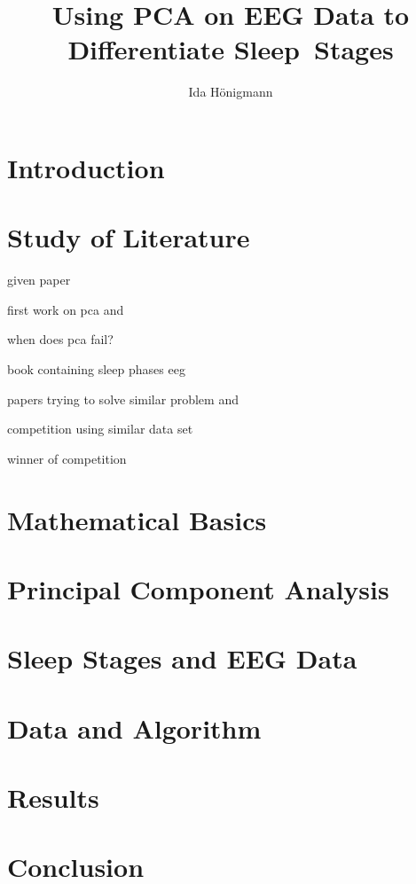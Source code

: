 \documentclass[a4paper]{IEEEtran}
\title{Using PCA on EEG Data to Differentiate Sleep~Stages}
\author{Ida Hönigmann}
\begin{document}
\maketitle

\begin{abstract}

\end{abstract}

\section{Introduction}

\section{Study of Literature}
given paper \cite{Jolliffe2016}

first work on pca \cite{Pearson1901} and \cite{Hotelling1933}

when does pca fail? \cite{Shlens2014}

book containing sleep phases eeg \cite{Ganong1997}

papers trying to solve similar problem \cite{Tautan2021} and \cite{Putilov2015}

competition using similar data set \cite{Ghassemi2018}

winner of competition \cite{Howe2018}

\section{Mathematical Basics}

\section{Principal Component Analysis}

\section{Sleep Stages and EEG Data}

\section{Data and Algorithm}

\section{Results}

\section{Conclusion}




\end{document}
